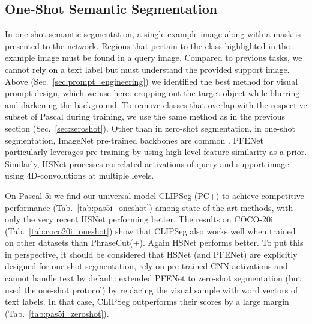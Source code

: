 \subsection{One-Shot Semantic Segmentation}

In one-shot semantic segmentation, a single example image along with a mask is presented to the network. Regions that pertain to the class highlighted in the example image must be found in a query image. Compared to previous tasks, we cannot rely on a text label but must understand the provided support image.
Above (Sec.~\ref{sec:prompt_engineering}) we identified the best method for visual prompt design, which we use here: cropping out the target object while blurring and darkening the background. 
To remove classes that overlap with the respective subset of Pascal during training, we use the same method as in the previous section (Sec.~\ref{sec:zeroshot}).
Other than in zero-shot segmentation, in one-shot segmentation, ImageNet pre-trained backbones are common \cite{tian20a, wang19a}. PFENet particularly leverages pre-training by using high-level feature similarity as a prior. Similarly, HSNet \cite{min21hsnet} processes correlated activations of query and support image using 4D-convolutions at multiple levels.

On Pascal-5i we find our universal model CLIPSeg (PC+) to achieve competitive performance (Tab.~\ref{tab:pas5i_oneshot}) among state-of-the-art methods, with only the very recent HSNet performing better.
The results on COCO-20i (Tab.~\ref{tab:coco20i_oneshot}) show that CLIPSeg also works well when trained on other datasets than PhraseCut(+). Again HSNet performs better. To put this in perspective, it should be considered that HSNet (and PFENet) are explicitly designed for one-shot segmentation, rely on pre-trained CNN activations and cannot handle text by default:
\citet{tian20a} extended PFENet to zero-shot segmentation (but used the one-shot protocol) by replacing the visual sample with word vectors \cite{word2vec, mikolov18} of text labels. In that case, CLIPSeg outperforms their scores by a large margin (Tab.~\ref{tab:pas5i_zeroshot}).

